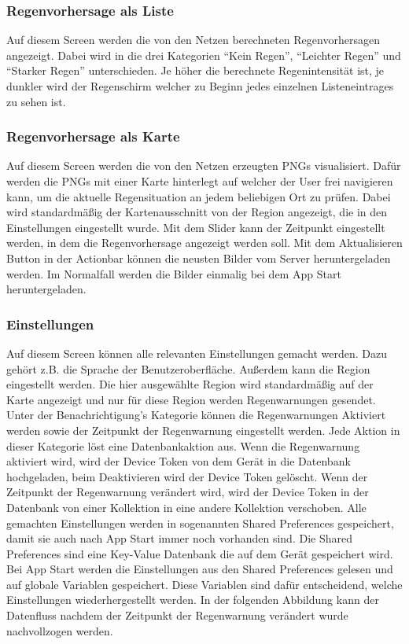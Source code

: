 \subsubsection*{Regenvorhersage als Liste}
Auf diesem Screen werden die von den Netzen berechneten Regenvorhersagen angezeigt. 
Dabei wird in die drei Kategorien “Kein Regen”, “Leichter Regen” und “Starker Regen” unterschieden. 
Je höher die berechnete Regenintensität ist, je dunkler wird der Regenschirm welcher zu Beginn jedes einzelnen Listeneintrages zu sehen ist.   

\subsubsection*{Regenvorhersage als Karte}
Auf diesem Screen werden die von den Netzen erzeugten PNGs visualisiert. 
Dafür werden die PNGs mit einer Karte hinterlegt auf welcher der User frei navigieren kann, 
um die aktuelle Regensituation an jedem beliebigen Ort zu prüfen. 
Dabei wird standardmäßig der Kartenausschnitt von der Region angezeigt, die in den Einstellungen eingestellt wurde. 
Mit dem Slider kann der Zeitpunkt eingestellt werden, in dem die Regenvorhersage angezeigt werden soll. 
Mit dem Aktualisieren Button in der Actionbar können die neusten Bilder vom Server heruntergeladen werden. 
Im Normalfall werden die Bilder einmalig bei dem App Start heruntergeladen.  

\subsubsection*{Einstellungen}
Auf diesem Screen können alle relevanten Einstellungen gemacht werden. Dazu gehört z.B. die Sprache der Benutzeroberfläche. Außerdem kann die Region 
eingestellt werden. Die hier ausgewählte Region wird standardmäßig auf der Karte angezeigt und nur für diese Region werden Regenwarnungen gesendet. 
Unter der Benachrichtigung’s Kategorie können die Regenwarnungen Aktiviert werden sowie der Zeitpunkt der Regenwarnung eingestellt werden. 
Jede Aktion in dieser Kategorie löst eine Datenbankaktion aus. Wenn die Regenwarnung aktiviert wird, wird der Device Token von dem Gerät in die 
Datenbank hochgeladen, beim Deaktivieren wird der Device Token gelöscht. Wenn der Zeitpunkt der Regenwarnung verändert wird, wird der Device 
Token in der Datenbank von einer Kollektion in eine andere Kollektion verschoben.   
Alle gemachten Einstellungen werden in sogenannten Shared Preferences gespeichert, damit sie auch nach App Start immer noch vorhanden sind. 
Die Shared Preferences sind eine Key-Value Datenbank die auf dem Gerät gespeichert wird. Bei App Start werden die Einstellungen aus den Shared 
Preferences gelesen und auf globale Variablen gespeichert. Diese Variablen sind dafür entscheidend, welche Einstellungen wiederhergestellt werden. 
In der folgenden Abbildung kann der Datenfluss nachdem der Zeitpunkt der Regenwarnung verändert wurde nachvollzogen werden.  


